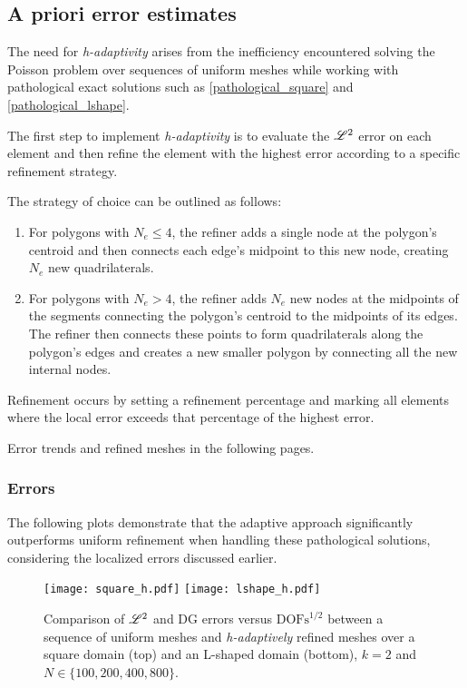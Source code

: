 \subsection{A priori error estimates}

The need for \textit{h-adaptivity} arises from the inefficiency encountered solving the Poisson problem over sequences of uniform meshes while working with pathological exact solutions such as \eqref{pathological_square} and \eqref{pathological_lshape}.

The first step to implement \textit{h-adaptivity} is to evaluate the $\mathscr{L}^2$ error on each element and then refine the element with the highest error according to a specific refinement strategy.

The strategy of choice can be outlined as follows:

\begin{enumerate}
    \item For polygons with $N_e \leq 4$, the refiner adds a single node at the polygon's centroid and then connects each edge's midpoint to this new node, creating $N_e$ new quadrilaterals.
    \item For polygons with $N_e > 4$, the refiner adds $N_e$ new nodes at the midpoints of the segments connecting the polygon's centroid to the midpoints of its edges. The refiner then connects these points to form quadrilaterals along the polygon's edges and creates a new smaller polygon by connecting all the new internal nodes.
\end{enumerate}

Refinement occurs by setting a refinement percentage and marking all elements where the local error exceeds that percentage of the highest error.

Error trends and refined meshes in the following pages.

\newpage
\subsubsection{Errors}

The following plots demonstrate that the adaptive approach significantly outperforms uniform refinement when handling these pathological solutions, considering the localized errors discussed earlier.

\begin{figure}[!ht]
	\centering
	\texttt{[image: square\_h.pdf]}
    \texttt{[image: lshape\_h.pdf]}
	\caption{Comparison of $\mathscr{L}^2$ and DG errors versus $\text{DOFs}^{1/2}$ between a sequence of uniform meshes and \textit{h-adaptively} refined meshes over a square domain (top) and an L-shaped domain (bottom), $k = 2$ and $N \in \{100, 200, 400, 800\}$.}
\end{figure}

